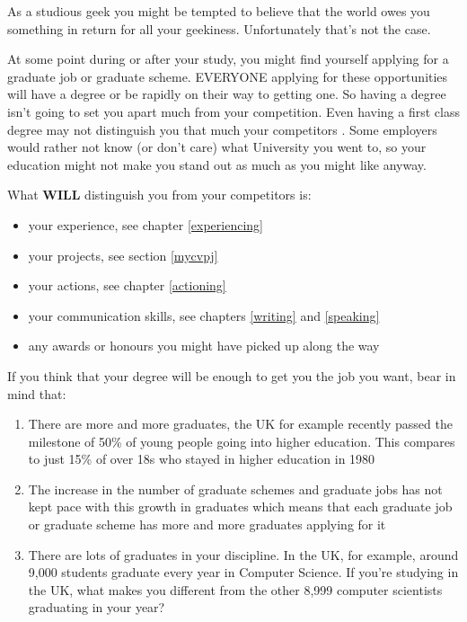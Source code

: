 \documentclass[
]{book}
\providecommand{\tightlist}{%
  \setlength{\itemsep}{0pt}\setlength{\parskip}{0pt}}
\begin{document}
As a studious geek you might be tempted to believe that the world owes you something in return for all your geekiness. Unfortunately that's not the case.

At some point during or after your study, you might find yourself applying for a graduate job or graduate scheme. EVERYONE applying for these opportunities will have a degree or be rapidly on their way to getting one. So having a degree isn't going to set you apart much from your competition. Even having a first class degree may not distinguish you that much your competitors \citep{gradeinflation, firstclass}. Some employers would rather not know (or don't care) what University you went to, so your education might not make you stand out as much as you might like anyway. \citep{bigfour, eyfirm}

What \textbf{WILL} distinguish you from your competitors is:

\begin{itemize}
\tightlist
\item
  your experience, see chapter \ref{experiencing}
\item
  your projects, see section \ref{mycvpj}
\item
  your actions, see chapter \ref{actioning}
\item
  your communication skills, see chapters \ref{writing} and \ref{speaking}
\item
  any awards or honours you might have picked up along the way
\end{itemize}

If you think that your degree will be enough to get you the job you want, bear in mind that:

\begin{enumerate}
\def\labelenumi{\arabic{enumi}.}
\tightlist
\item
  There are more and more graduates, the UK for example recently passed the milestone of 50\% of young people going into higher education. This compares to just 15\% of over 18s who stayed in higher education in 1980 \citep{lotsofgrads}
\item
  The increase in the number of graduate schemes and graduate jobs has not kept pace with this growth in graduates which means that each graduate job or graduate scheme has more and more graduates applying for it
\item
  There are lots of graduates in your discipline. In the UK, for example, around 9,000 students graduate every year in Computer Science. If you're studying in the UK, what makes you different from the other 8,999 computer scientists graduating in your year?
\end{enumerate}
\end{document}
